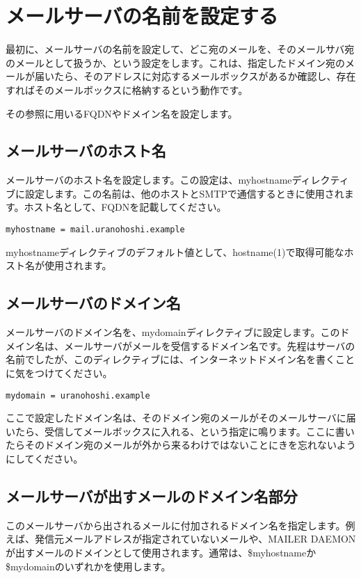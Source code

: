 \section{メールサーバの名前を設定する}
最初に、メールサーバの名前を設定して、どこ宛のメールを、そのメールサバ宛のメールとして扱うか、という設定をします。これは、指定したドメイン宛のメールが届いたら、そのアドレスに対応するメールボックスがあるか確認し、存在すればそのメールボックスに格納するという動作です。

その参照に用いるFQDNやドメイン名を設定します。

\subsection{メールサーバのホスト名}
メールサーバのホスト名を設定します。この設定は、myhostnameディレクティブに設定します。この名前は、他のホストとSMTPで通信するときに使用されます。ホスト名として、FQDNを記載してください。

\begin{lstlisting}[basicstyle=\ttfamily\footnotesize, frame=single]
myhostname = mail.uranohoshi.example
\end{lstlisting}

myhostnameディレクティブのデフォルト値として、hostname(1)で取得可能なホスト名が使用されます。

\subsection{メールサーバのドメイン名}
メールサーバのドメイン名を、mydomainディレクティブに設定します。このドメイン名は、メールサーバがメールを受信するドメイン名です。先程はサーバの名前でしたが、このディレクティブには、インターネットドメイン名を書くことに気をつけてください。

\begin{lstlisting}[basicstyle=\ttfamily\footnotesize, frame=single]
mydomain = uranohoshi.example
\end{lstlisting}

ここで設定したドメイン名は、そのドメイン宛のメールがそのメールサーバに届いたら、受信してメールボックスに入れる、という指定に鳴ります。ここに書いたらそのドメイン宛のメールが外から来るわけではないことにきを忘れないようにしてください。

\subsection{メールサーバが出すメールのドメイン名部分}
このメールサーバから出されるメールに付加されるドメイン名を指定します。例えば、発信元メールアドレスが指定されていないメールや、MAILER DAEMONが出すメールのドメインとして使用されます。通常は、\$myhostnameか\$mydomainのいずれかを使用します。

